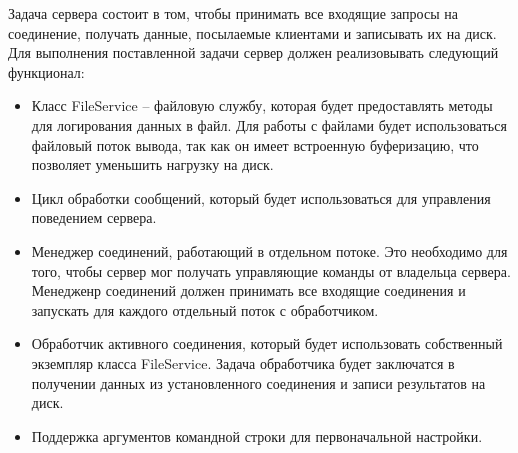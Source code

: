 Задача сервера состоит в том, чтобы принимать все входящие запросы на соединение, получать данные, посылаемые клиентами и записывать их на диск. Для выполнения поставленной задачи сервер должен реализовывать следующий функционал:
\begin{itemize}
	\item Класс FileService -- файловую службу, которая будет предоставлять методы для логирования данных в файл. Для работы с файлами будет использоваться файловый поток вывода, так как он имеет встроенную буферизацию, что позволяет уменьшить нагрузку на диск.
	\item Цикл обработки сообщений, который будет использоваться для управления поведением сервера.
	\item Менеджер соединений, работающий в отдельном потоке. Это необходимо для того, чтобы сервер мог получать управляющие команды от владельца сервера. Менедженр соединений должен принимать все входящие соединения и запускать для каждого отдельный поток с обработчиком.
	\item Обработчик активного соединения, который будет использовать собственный экземпляр класса FileService. Задача обработчика будет заключатся в получении данных из установленного соединения и записи результатов на диск.
	\item Поддержка аргументов командной строки для первоначальной настройки.

\end{itemize} 

